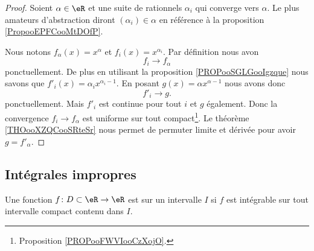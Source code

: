 \begin{proof}
    Soient \( \alpha\in \eR\) et une suite de rationnels \( \alpha_i\) qui converge vers \( \alpha\). Le plus amateurs d'abstraction diront \( (\alpha_i)\in \alpha\) en référence à la proposition \ref{PropooEPFCooMtDOfP}.

    Nous notons \( f_{\alpha}(x)=x^{\alpha}\) et \( f_i(x)=x^{\alpha_i}\). Par définition nous avon
    \begin{equation}
        f_i\to f_{\alpha}
    \end{equation}
    ponctuellement. De plus en utilisant la proposition \ref{PROPooSGLGooIgzque} nous savons que \( f'_i(x)=\alpha_i x^{\alpha_i-1}\). En posant \( g(x)=\alpha x^{\alpha-1}\) nous avons donc
    \begin{equation}
        f'_i\to g.
    \end{equation}
    ponctuellement. Mais \( f'_i\) est continue pour tout \( i\) et \( g\) également. Donc la convergence \( f_i\to f_{\alpha}\) est uniforme sur tout compact\footnote{Proposition \ref{PROPooFWVIooCzXojO}.}. Le théorème \ref{THOooXZQCooSRteSr} nous permet de permuter limite et dérivée pour avoir \( g=f'_{\alpha}\).
\end{proof}

\subsection{Intégrales impropres}
\label{SecGAVooBOQddU}


\begin{definition}
    Une fonction \( f\colon D\subset\eR\to \eR\) est  sur un intervalle \( I\) si \( f\) est intégrable sur tout intervalle compact contenu dans \( I\).
\end{definition}


